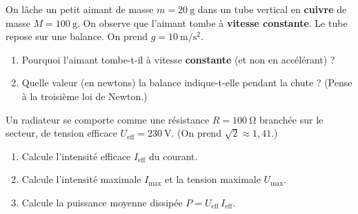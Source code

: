 \documentclass[11pt,a4paper]{article}
\begin{document}
\begin{exo}
On lâche un petit aimant de masse $m=\qty{20}{\gram}$ dans un tube vertical en \textbf{cuivre} de
masse $M=\qty{100}{\gram}$. On observe que l'aimant tombe à \textbf{vitesse constante}. Le tube repose
sur une balance. On prend $g=\qty{10}{\metre\per\second\squared}$.
\begin{center}
\end{center}
\begin{enumerate}[label=\alph*)]
  \item Pourquoi l'aimant tombe-t-il à vitesse \textbf{constante} (et non en accélérant) ?
  \item Quelle valeur (en newtons) la balance indique-t-elle pendant la chute ? (Pense à la
        troisième loi de Newton.)
\end{enumerate}
\end{exo}

\begin{exo}
Un radiateur se comporte comme une résistance $R=\qty{100}{\ohm}$ branchée sur le secteur, de tension
efficace $U_{\text{eff}}=\qty{230}{\volt}$. (On prend $\sqrt2\approx1{,}41$.)
\begin{enumerate}[label=\alph*)]
  \item Calcule l'intensité efficace $I_{\text{eff}}$ du courant.
  \item Calcule l'intensité maximale $I_{\max}$ et la tension maximale $U_{\max}$.
  \item Calcule la puissance moyenne dissipée $P=U_{\text{eff}}\,I_{\text{eff}}$.
\end{enumerate}
\end{exo}
\end{document}
